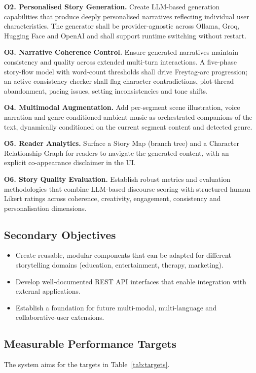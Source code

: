 \textbf{O2. Personalised Story Generation.} Create LLM-based
generation capabilities that produce deeply personalised narratives
reflecting individual user characteristics. The generator shall be
provider-agnostic across Ollama, Groq, Hugging Face and OpenAI and
shall support runtime switching without restart.

\textbf{O3. Narrative Coherence Control.} Ensure generated narratives
maintain consistency and quality across extended multi-turn
interactions. A five-phase story-flow model with word-count thresholds
shall drive Freytag-arc progression; an active consistency checker
shall flag character contradictions, plot-thread abandonment, pacing
issues, setting inconsistencies and tone shifts.

\textbf{O4. Multimodal Augmentation.} Add per-segment scene
illustration, voice narration and genre-conditioned ambient music as
orchestrated companions of the text, dynamically conditioned on the
current segment content and detected genre.

\textbf{O5. Reader Analytics.} Surface a Story Map (branch tree) and a
Character Relationship Graph for readers to navigate the generated
content, with an explicit co-appearance disclaimer in the UI.

\textbf{O6. Story Quality Evaluation.} Establish robust metrics and
evaluation methodologies that combine LLM-based discourse scoring with
structured human Likert ratings across coherence, creativity,
engagement, consistency and personalisation dimensions.

\subsection{Secondary Objectives}
\begin{itemize}
    \item Create reusable, modular components that can be adapted
    for different storytelling domains (education, entertainment,
    therapy, marketing).
    \item Develop well-documented REST API interfaces that enable
    integration with external applications.
    \item Establish a foundation for future multi-modal,
    multi-language and collaborative-user extensions.
\end{itemize}

\subsection{Measurable Performance Targets}
The system aims for the targets in Table~\ref{tab:targets}.

